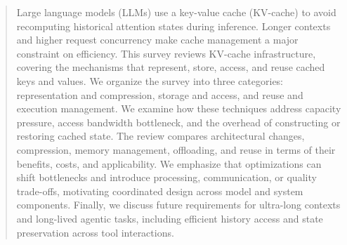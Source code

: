\begin{abstract}
Large language models (LLMs) use a key-value cache (KV-cache) to avoid recomputing historical attention states during inference. Longer contexts and higher request concurrency make cache management a major constraint on efficiency. This survey reviews KV-cache infrastructure, covering the mechanisms that represent, store, access, and reuse cached keys and values. We organize the survey into three categories: representation and compression, storage and access, and reuse and execution management. We examine how these techniques address capacity pressure, access bandwidth bottleneck, and the overhead of constructing or restoring cached state. The review compares architectural changes, compression, memory management, offloading, and reuse in terms of their benefits, costs, and applicability. We emphasize that optimizations can shift bottlenecks and introduce processing, communication, or quality trade-offs, motivating coordinated design across model and system components. Finally, we discuss future requirements for ultra-long contexts and long-lived agentic tasks, including efficient history access and state preservation across tool interactions.
\end{abstract}
